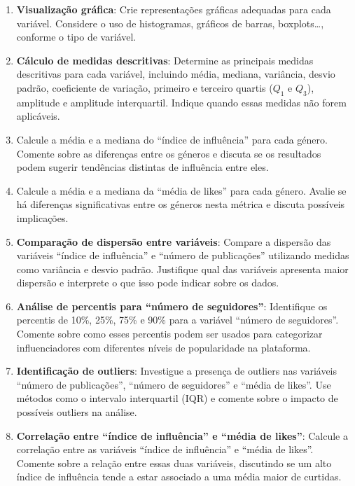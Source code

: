 \documentclass[
]{book}
\newenvironment{Shaded}{\begin{snugshade}}{\end{snugshade}}
\newcommand{\CommentTok}[1]{\textcolor[rgb]{0.56,0.35,0.01}{\textit{#1}}}
\newcommand{\FunctionTok}[1]{\textcolor[rgb]{0.13,0.29,0.53}{\textbf{#1}}}
\newcommand{\NormalTok}[1]{#1}
\newcommand{\OtherTok}[1]{\textcolor[rgb]{0.56,0.35,0.01}{#1}}
\newcommand{\SpecialCharTok}[1]{\textcolor[rgb]{0.81,0.36,0.00}{\textbf{#1}}}
\begin{document}
\begin{Shaded}
\end{Shaded}

\begin{enumerate}
\def\labelenumi{(\alph{enumi})}
\setcounter{enumi}{2}
\item
  \textbf{Visualização gráfica}: Crie representações gráficas adequadas para cada variável. Considere o uso de histogramas, gráficos de barras, boxplots\ldots, conforme o tipo de variável.
\item
  \textbf{Cálculo de medidas descritivas}: Determine as principais medidas descritivas para cada variável, incluindo média, mediana, variância, desvio padrão, coeficiente de variação, primeiro e terceiro quartis (\(Q_1\) e \(Q_3\)), amplitude e amplitude interquartil. Indique quando essas medidas não forem aplicáveis.
\item
  Calcule a média e a mediana do ``índice de influência'' para cada género. Comente sobre as diferenças entre os géneros e discuta se os resultados podem sugerir tendências distintas de influência entre eles.
\item
  Calcule a média e a mediana da ``média de likes'' para cada género. Avalie se há diferenças significativas entre os géneros nesta métrica e discuta possíveis implicações.
\item
  \textbf{Comparação de dispersão entre variáveis}: Compare a dispersão das variáveis ``índice de influência'' e ``número de publicações'' utilizando medidas como variância e desvio padrão. Justifique qual das variáveis apresenta maior dispersão e interprete o que isso pode indicar sobre os dados.
\item
  \textbf{Análise de percentis para ``número de seguidores''}: Identifique os percentis de 10\%, 25\%, 75\% e 90\% para a variável ``número de seguidores''. Comente sobre como esses percentis podem ser usados para categorizar influenciadores com diferentes níveis de popularidade na plataforma.
\item
  \textbf{Identificação de outliers}: Investigue a presença de outliers nas variáveis ``número de publicações'', ``número de seguidores'' e ``média de likes''. Use métodos como o intervalo interquartil (IQR) e comente sobre o impacto de possíveis outliers na análise.
\item
  \textbf{Correlação entre ``índice de influência'' e ``média de likes''}: Calcule a correlação entre as variáveis ``índice de influência'' e ``média de likes''. Comente sobre a relação entre essas duas variáveis, discutindo se um alto índice de influência tende a estar associado a uma média maior de curtidas.
\end{enumerate}
\end{document}
